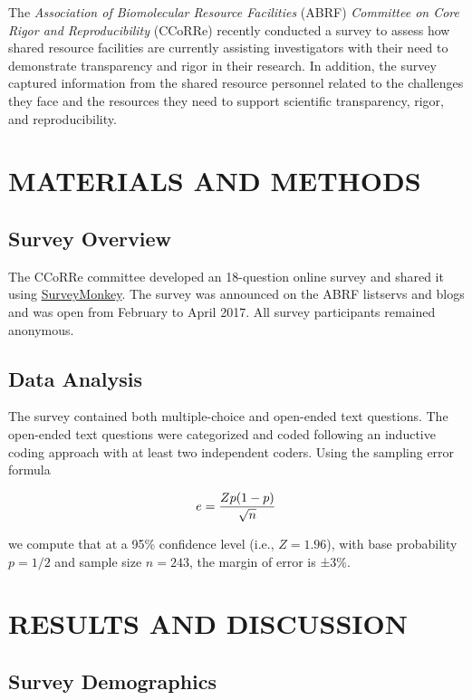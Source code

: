 \documentclass[]{article}
\begin{document}
The \emph{Association of Biomolecular Resource Facilities} (ABRF)
\emph{Committee on Core Rigor and Reproducibility} (CCoRRe) recently
conducted a survey to assess how shared resource facilities are
currently assisting investigators with their need to demonstrate
transparency and rigor in their research. In addition, the survey
captured information from the shared resource personnel related to the
challenges they face and the resources they need to support scientific
transparency, rigor, and reproducibility.

\section{MATERIALS AND METHODS}\label{materials-and-methods}

\subsection{Survey Overview}\label{survey-overview}

The CCoRRe committee developed an 18-question online survey and shared
it using \href{https://surveymonkey.com}{SurveyMonkey}. The survey was
announced on the ABRF listservs and blogs and was open from February to
April 2017. All survey participants remained anonymous.

\subsection{Data Analysis}\label{data-analysis}

The survey contained both multiple-choice and open-ended text questions.
The open-ended text questions were categorized and coded following an
inductive coding approach with at least two independent coders. Using
the sampling error formula

\[ e = { Zp(1-p) \over \sqrt{n} } \]

we compute that at a 95\% confidence level (i.e., \(Z=1.96\)), with base
probability \(p=1/2\) and sample size \(n=243\), the margin of error is
±3\%.

\section{RESULTS AND DISCUSSION}\label{results-and-discussion}

\subsection{Survey Demographics}\label{survey-demographics}
\end{document}
